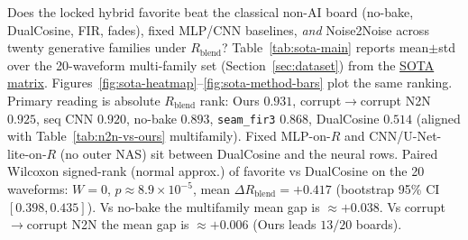 Does the locked hybrid favorite beat the classical non-AI board (no-bake, DualCosine, FIR, fades),
fixed MLP/CNN baselines, \emph{and} Noise2Noise across twenty generative families under $R_{\mathrm{blend}}$?
Table~\ref{tab:sota-main} reports mean$\pm$std over the 20-waveform multi-family set (Section~\ref{sec:dataset}) from the \href{https://github.com/reeldemo/denoise-opt-meta/blob/master/paper/Unsupervised_Wrap-Discontinuity_Repair_in_Wavetable_Synthesis_via_Hybrid_GA-PPO_Meta-Search_v12/figures/sota_matrix.json}{SOTA matrix}.
Figures~\ref{fig:sota-heatmap}--\ref{fig:sota-method-bars} plot the same ranking.
Primary reading is absolute $R_{\mathrm{blend}}$ rank:
Ours $0.931$, corrupt$\to$corrupt N2N $0.925$, seq CNN $0.920$, no-bake $0.893$,
\texttt{seam\_fir3} $0.868$, DualCosine $0.514$
(aligned with Table~\ref{tab:n2n-vs-ours} multifamily).
Fixed MLP-on-$R$ and CNN/U-Net-lite-on-$R$ (no outer NAS) sit between DualCosine and the neural rows.
Paired Wilcoxon signed-rank (normal approx.) of favorite vs DualCosine on the 20 waveforms: $W{=}0$, $p{\approx}8.9{\times}10^{-5}$, mean $\Delta R_{\mathrm{blend}}{=}{+}0.417$ (bootstrap 95\% CI $[0.398,0.435]$).
Vs no-bake the multifamily mean gap is $\approx{+}0.038$.
Vs corrupt$\to$corrupt N2N the mean gap is $\approx{+}0.006$ (Ours leads $13/20$ boards).

